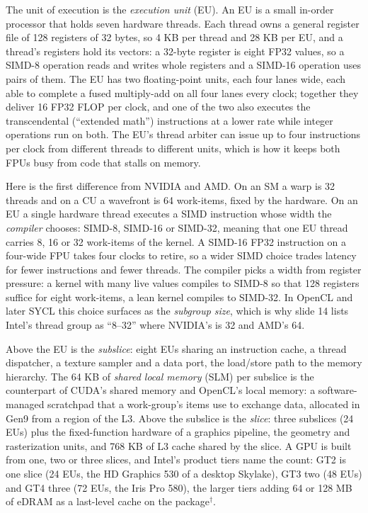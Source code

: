 \documentclass[11pt,letterpaper]{article}
\begin{document}
The unit of execution is the \emph{execution unit} (EU). An EU is a small in-order processor that holds seven hardware threads. Each thread owns a general register file of 128 registers of 32 bytes, so 4 KB per thread and 28 KB per EU, and a thread's registers hold its vectors: a 32-byte register is eight FP32 values, so a SIMD-8 operation reads and writes whole registers and a SIMD-16 operation uses pairs of them. The EU has two floating-point units, each four lanes wide, each able to complete a fused multiply-add on all four lanes every clock; together they deliver 16 FP32 FLOP per clock, and one of the two also executes the transcendental (``extended math'') instructions at a lower rate while integer operations run on both. The EU's thread arbiter can issue up to four instructions per clock from different threads to different units, which is how it keeps both FPUs busy from code that stalls on memory.

Here is the first difference from NVIDIA and AMD. On an SM a warp is 32 threads and on a CU a wavefront is 64 work-items, fixed by the hardware. On an EU a single hardware thread executes a SIMD instruction whose width the \emph{compiler} chooses: SIMD-8, SIMD-16 or SIMD-32, meaning that one EU thread carries 8, 16 or 32 work-items of the kernel. A SIMD-16 FP32 instruction on a four-wide FPU takes four clocks to retire, so a wider SIMD choice trades latency for fewer instructions and fewer threads. The compiler picks a width from register pressure: a kernel with many live values compiles to SIMD-8 so that 128 registers suffice for eight work-items, a lean kernel compiles to SIMD-32. In OpenCL and later SYCL this choice surfaces as the \emph{subgroup size}, which is why slide 14 lists Intel's thread group as ``8--32'' where NVIDIA's is 32 and AMD's 64.

Above the EU is the \emph{subslice}: eight EUs sharing an instruction cache, a thread dispatcher, a texture sampler and a data port, the load/store path to the memory hierarchy. The 64 KB of \emph{shared local memory} (SLM) per subslice is the counterpart of CUDA's shared memory and OpenCL's local memory: a software-managed scratchpad that a work-group's items use to exchange data, allocated in Gen9 from a region of the L3. Above the subslice is the \emph{slice}: three subslices (24 EUs) plus the fixed-function hardware of a graphics pipeline, the geometry and rasterization units, and 768 KB of L3 cache shared by the slice. A GPU is built from one, two or three slices, and Intel's product tiers name the count: GT2 is one slice (24 EUs, the HD Graphics 530 of a desktop Skylake), GT3 two (48 EUs) and GT4 three (72 EUs, the Iris Pro 580), the larger tiers adding 64 or 128 MB of eDRAM as a last-level cache on the package$^\dagger$.
\end{document}
